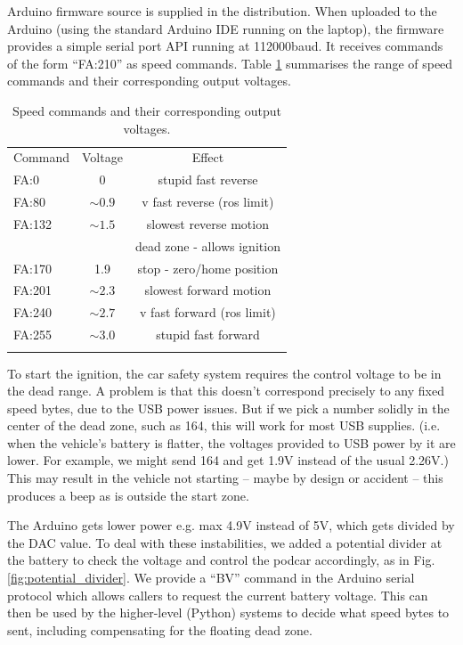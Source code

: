 \documentclass[a4paper]{article}
\begin{document}
	Arduino firmware source is supplied in the distribution. When uploaded to the Arduino (using the standard Arduino IDE running on the laptop), the firmware provides a simple serial port API running at 112000baud. It receives commands of the form ``FA:210'' as speed commands. Table \ref{tab:speed_commands} summarises the range of speed commands and their corresponding output voltages. 
	
	\begin{table}
		\begin{center}
			\caption{Speed commands and their corresponding output voltages.}
			\label{tab:speed_commands}
			\begin{tabular}{ l c c }
				\hline
				Command   &    Voltage            &  Effect \\
				FA:0      &    0                  & stupid fast reverse  \\
				FA:80     &    $\sim 0.9$         & v fast reverse (ros limit) \\
				FA:132    &   $\sim 1.5$          & slowest reverse motion  \\
				&                       & dead zone - allows ignition \\
				FA:170    &    1.9                & stop - zero/home position \\
				FA:201    &    $\sim 2.3$         & slowest forward motion \\
				FA:240    &    $\sim 2.7$         & v fast forward (ros limit) \\
				FA:255    &    $\sim 3.0$         & stupid fast forward \\
				\hline\\
			\end{tabular}
		\end{center}    
	\end{table}
	
	To start the ignition, the car safety system requires the control voltage to be in the dead range. A problem is that this doesn’t correspond precisely to any fixed speed bytes, due to the USB power issues.  But if we pick a number solidly in the center of the dead zone, such as 164, this will work for most USB supplies. (i.e. when the vehicle’s battery is flatter, the voltages provided to USB power by it are lower. For example, we might send 164 and get 1.9V instead of the usual 2.26V.) This may result in the vehicle not starting -- maybe by design or accident -- this produces a beep as is outside the start zone. 
	
	The Arduino gets lower power e.g. max 4.9V instead of 5V, which gets divided by the DAC value. To deal with these instabilities, we added a potential divider at the battery to check the voltage and control the podcar accordingly, as in Fig. \ref{fig:potential_divider}. We provide a ``BV'' command in the Arduino serial protocol which allows callers to request the current battery voltage. This can then be used by the higher-level (Python) systems to decide what speed bytes to sent, including compensating for the floating dead zone.
	
\end{document}
